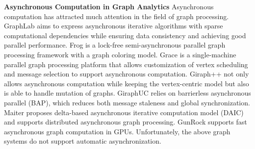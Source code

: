 


\noindent\textbf{Asynchronous Computation in Graph Analytics} Asynchronous computation has attracted much attention in the field of graph processing. GraphLab \cite{Low:2012:DGF:2212351.2212354} aims to express asynchronous iterative algorithms with sparse computational dependencies while ensuring data consistency and achieving good parallel performance. Frog \cite{8017445} is a lock-free semi-asynchronous parallel graph processing framework with a graph coloring model. Grace \cite{grace} is a single-machine parallel graph processing platform that allows customization of vertex scheduling and message selection to support asynchronous computation. Giraph++ \cite{Tian:2013:TLV:2732232.2732238} not only allows asynchronous computation while keeping the vertex-centric model but also is able to handle mutation of graphs. GiraphUC \cite{Han:2015:GUB:2777598.2777604} relies on barrierless asynchronous parallel (BAP), which reduces both message staleness and global synchronization. Maiter \cite{maiter} proposes delta-based asynchronous iterative computation model (DAIC) and supports distributed asynchronous graph processing. GunRock \cite{Wang:2016:GHG:2851141.2851145} supports fast asynchronous graph computation in GPUs. Unfortunately, the above graph systems do not support automatic asynchronization.

